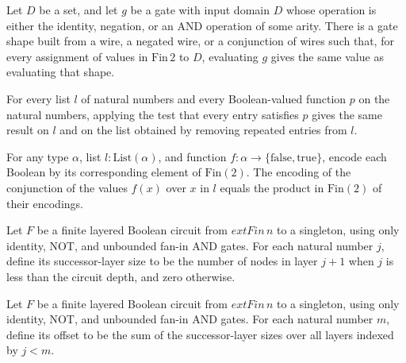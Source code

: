 \begin{theorem}
\label{BoolCircuit.gateShape_spec}
\leanok
{}
Let $D$ be a set, and let $g$ be a gate with input domain $D$ whose operation is either
the identity, negation, or an AND operation of some arity. There is a gate shape built
from a wire, a negated wire, or a conjunction of wires such that, for every assignment
of values in $\mathrm{Fin}\,2$ to $D$, evaluating $g$ gives the same value as
evaluating that shape.
\end{theorem}

\begin{theorem}
\label{BoolCircuit.all_dedup'}
\leanok
{}
For every list $l$ of natural numbers and every Boolean-valued function $p$ on the
natural numbers, applying the test that every entry satisfies $p$ gives the same result
on $l$ and on the list obtained by removing repeated entries from $l$.
\end{theorem}

\begin{theorem}
\label{BoolCircuit.b2f_all}
\leanok
{}
For any type $\alpha$, list $l : \mathrm{List}(\alpha)$, and function $f : \alpha \to
\{\mathrm{false},\mathrm{true}\}$, encode each Boolean by its corresponding element of
$\mathrm{Fin}(2)$. The encoding of the conjunction of the values $f(x)$ over $x$ in $l$
equals the product in $\mathrm{Fin}(2)$ of their encodings.
\end{theorem}

\begin{definition}
\label{BoolCircuit.LayeredCircuit.succCard}
\leanok
Let $F$ be a finite layered Boolean circuit from $	ext{Fin}\,n$ to a singleton, using
only identity, NOT, and unbounded fan-in AND gates. For each natural number $j$, define
its successor-layer size to be the number of nodes in layer $j+1$ when $j$ is less than
the circuit depth, and zero otherwise.
\end{definition}

\begin{definition}
\label{BoolCircuit.LayeredCircuit.offset}
\leanok
{}
Let $F$ be a finite layered Boolean circuit from $	ext{Fin}\,n$ to a singleton, using
only identity, NOT, and unbounded fan-in AND gates. For each natural number $m$, define
its offset to be the sum of the successor-layer sizes over all layers indexed by $j<m$.
\end{definition}

